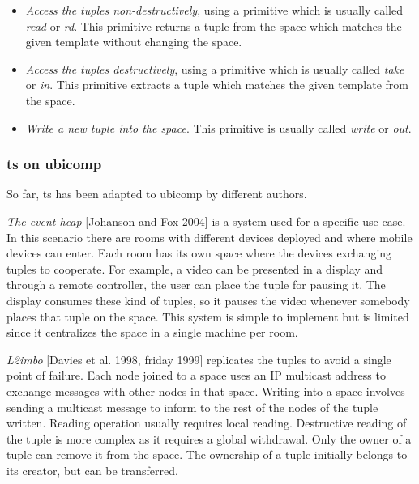 \begin{itemize}
  \item \emph{Access the tuples non-destructively}, using a primitive which is usually called \emph{read} or \emph{rd}.
	This primitive returns a tuple from the space which matches the given template without changing the space.
  \item \emph{Access the tuples destructively}, using a primitive which is usually called \emph{take} or \emph{in}.
	This primitive extracts a tuple which matches the given template from the space.
  \item \emph{Write a new tuple into the space}. This primitive is usually called \emph{write} or \emph{out}.
\end{itemize}



\subsubsection{\ac{ts} on \ac{ubicomp}}
So far, \acl{ts} has been adapted to \acl{ubicomp} by different authors.

\emph{The event heap} [Johanson and Fox 2004] is a system used for a specific use case. %
In this scenario there are rooms with different devices deployed and where mobile devices can enter.
Each room has its own space where the devices exchanging tuples to cooperate.
For example, a video can be presented in a display and through a remote controller, the user can place the tuple for pausing it.
The display consumes these kind of tuples, so it pauses the video whenever somebody places that tuple on the space.
This system is simple to implement but is limited since it centralizes the space in a single machine per room. %


\emph{L2imbo} [Davies et al. 1998, friday 1999] replicates the tuples to avoid a single point of failure. %
Each node joined to a space uses an IP multicast address to exchange messages with other nodes in that space.
Writing into a space involves sending a multicast message to inform to the rest of the nodes of the tuple written.
Reading operation usually requires local reading.
Destructive reading of the tuple is more complex as it requires a global withdrawal.
Only the owner of a tuple can remove it from the space.
The ownership of a tuple initially belongs to its creator, but can be transferred. %


